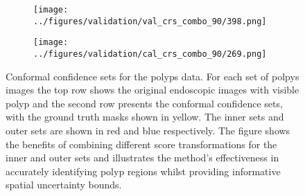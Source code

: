 \begin{figure}[h!]
\begin{subfigure}{0.19\textwidth}
		\label{fig:1}
	\end{subfigure}
	\begin{subfigure}{0.19\textwidth}
		\centering
		\texttt{[image: ../figures/validation/val\_crs\_combo\_90/398.png]}
		\label{fig:1}
	\end{subfigure}
	\begin{subfigure}{0.19\textwidth}
		\centering
		\texttt{[image: ../figures/validation/cal\_crs\_combo\_90/269.png]}
		\label{fig:1}
	\end{subfigure}
	\label{fig:grid}
	\caption{Conformal confidence sets for the polyps data. For each set of polpys images the top row shows the original endoscopic images with visible polyp and the second row presents the conformal confidence sets, with the ground truth masks shown in yellow. The inner sets and outer sets are shown in red and blue respectively. The figure shows the benefits of combining different score transformations for the inner and outer sets and illustrates the method's effectiveness in accurately identifying polyp regions whilst providing informative spatial uncertainty bounds.}\label{fig:res}
\end{figure}
